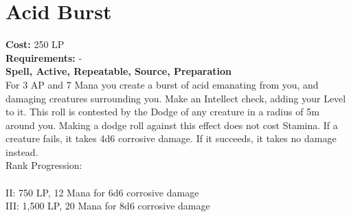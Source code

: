 \section{Acid Burst}\label{spell:acidBurst}
\textbf{Cost:} 250 LP\\
\textbf{Requirements:} -\\
\textbf{Spell, Active, Repeatable, Source, Preparation}\\
For 3 AP and 7 Mana you create a burst of acid emanating from you, and damaging creatures surrounding you.
Make an Intellect check, adding your Level to it.
This roll is contested by the Dodge of any creature in a radius of 5m around you.
Making a dodge roll against this effect does not cost Stamina.
If a creature fails, it takes 4d6 corrosive damage.
If it succeeds, it takes no damage instead.
\\
Rank Progression:\\
\\
II: 750 LP, 12 Mana for 6d6 corrosive damage\\
III: 1,500 LP, 20 Mana for 8d6 corrosive damage\\
